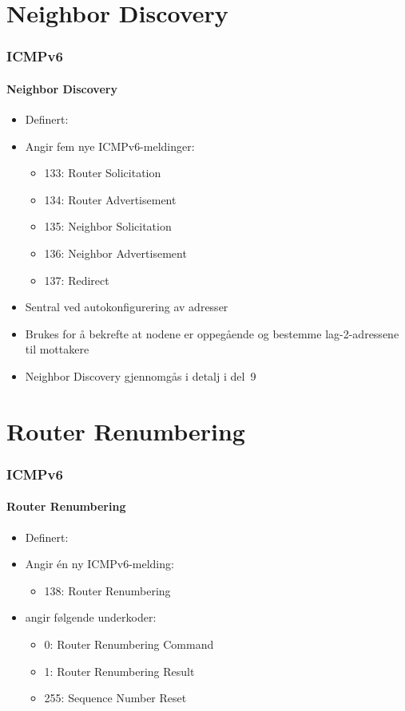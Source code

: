 \section{Neighbor Discovery}
\begin{frame}
  \frametitle{ICMPv6}
  \framesubtitle{Neighbor Discovery}
  \begin{itemize}
  \item Definert: 
  \item Angir fem nye ICMPv6-meldinger:
    \begin{itemize}
    \item 133: Router Solicitation
    \item 134: Router Advertisement
    \item 135: Neighbor Solicitation
    \item 136: Neighbor Advertisement
    \item 137: Redirect
    \end{itemize}
  \item Sentral ved autokonfigurering av adresser
  \item Brukes for å bekrefte at nodene er oppegående og bestemme
    lag-2-adressene til mottakere
  \item Neighbor Discovery gjennomgås i detalj i del~9
  \end{itemize}
\end{frame}

\section{Router Renumbering}
\begin{frame}
  \frametitle{ICMPv6}
  \framesubtitle{Router Renumbering}
  \begin{itemize}
  \item Definert: 
  \item Angir én ny ICMPv6-melding:
    \begin{itemize}
    \item 138: Router Renumbering
    \end{itemize}
  \item {} angir
    følgende underkoder:
    \begin{itemize}
    \item 0: Router Renumbering Command
    \item 1: Router Renumbering Result
    \item 255: Sequence Number Reset
    \end{itemize}
  \end{itemize}
\end{frame}

